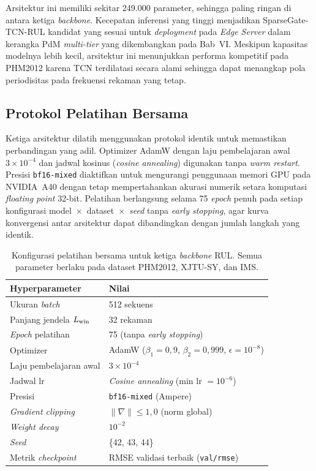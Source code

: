 Arsitektur ini memiliki sekitar 249.000 parameter, sehingga paling ringan di antara
ketiga \emph{backbone}.
Kecepatan inferensi yang tinggi menjadikan SparseGate-TCN-RUL kandidat
yang sesuai untuk \emph{deployment} pada \emph{Edge Server}
dalam kerangka PdM \emph{multi-tier} yang dikembangkan pada Bab~VI.
Meskipun kapasitas modelnya lebih kecil, arsitektur ini menunjukkan performa
kompetitif pada PHM2012 karena TCN terdilatasi secara alami sehingga dapat menangkap pola
periodisitas pada frekuensi rekaman yang tetap.

\subsection{Protokol Pelatihan Bersama}
\label{subsec:bab5_protokol_pelatihan}

Ketiga arsitektur dilatih menggunakan protokol identik untuk memastikan
perbandingan yang adil.
Optimizer AdamW  dengan laju pembelajaran awal
$3 \times 10^{-4}$ dan jadwal kosinus (\emph{cosine annealing}) digunakan
tanpa \emph{warm restart}.
Presisi \texttt{bf16-mixed} diaktifkan untuk mengurangi penggunaan memori GPU
pada NVIDIA~A40 {\color{blue}dengan tetap mempertahankan akurasi numerik setara komputasi 
\emph{floating point} 32-bit}.
Pelatihan berlangsung selama 75 \emph{epoch} penuh pada setiap konfigurasi
model~$\times$~dataset~$\times$~\emph{seed} tanpa \emph{early stopping},
agar kurva konvergensi antar arsitektur dapat dibandingkan dengan jumlah
langkah yang identik.

\begin{table}[ht]
\centering
\caption{Konfigurasi pelatihan bersama untuk ketiga \emph{backbone} RUL.
         Semua parameter berlaku pada dataset PHM2012, XJTU-SY, dan IMS.}
\label{tab:bab5_protokol}
\small
\begin{tabular}{@{}ll@{}}
\toprule
\textbf{Hyperparameter} & \textbf{Nilai} \\
\midrule
Ukuran \emph{batch}       & 512 sekuens \\
Panjang jendela $L_{\rm win}$ & 32 rekaman \\
\emph{Epoch} pelatihan    & 75 (tanpa \emph{early stopping}) \\
Optimizer                 & AdamW ($\beta_1 = 0{,}9$, $\beta_2 = 0{,}999$, $\epsilon = 10^{-8}$) \\
Laju pembelajaran awal    & $3 \times 10^{-4}$ \\
Jadwal lr                 & \emph{Cosine annealing} (min lr $= 10^{-6}$) \\
Presisi                   & \texttt{bf16-mixed} (Ampere) \\
\emph{Gradient clipping}  & $\| \nabla \| \leq 1{,}0$ (norm global) \\
\emph{Weight decay}       & $10^{-2}$ \\
\emph{Seed}               & \{42, 43, 44\} \\
Metrik \emph{checkpoint}  & RMSE validasi terbaik (\texttt{val/rmse}) \\
\bottomrule
\end{tabular}
\end{table}


